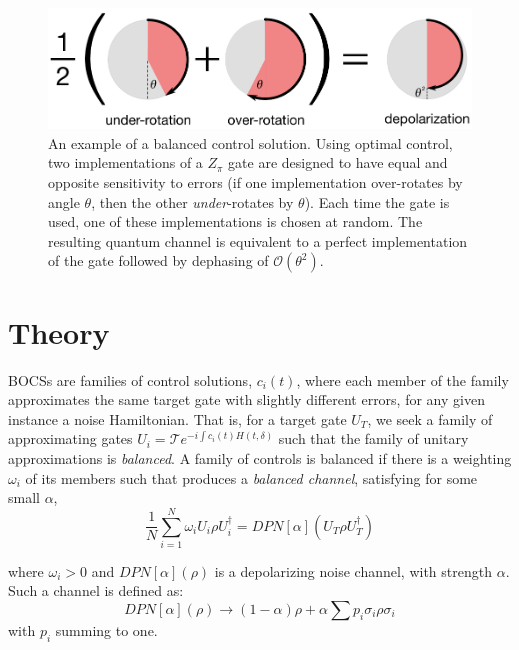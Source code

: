 \documentclass[aps,nofootinbib,pra,notitlepage,twocolumn]{revtex4-1}
\newcommand{\order}[1]{\mathcal{O}\left( #1 \right)}
\begin{document}
\begin{figure}
  \centering
  \includegraphics[width=\columnwidth]{simple_example.pdf}
  \caption{An example of a balanced control solution. Using optimal control, two implementations of a $Z_\pi$ gate are designed to have equal and opposite sensitivity to errors (if one implementation over-rotates by angle $\theta$, then the other \emph{under}-rotates by $\theta$). Each time the gate is used, one of these implementations is chosen at random. The resulting quantum channel is equivalent to a perfect implementation of the gate followed by dephasing of $\order{\theta^2}$.}
  \label{fig:simple_example}
\end{figure}

\section{Theory}
 BOCSs are families of control solutions, $c_i(t)$, where each member of the family approximates the same target gate with slightly different errors, for any given instance a noise Hamiltonian. That is, for a target gate $U_T$, we seek a family of approximating gates $U_i = \mathcal{T}e^{-i\int c_i(t)H(t, \delta)}$ such that the family of unitary approximations is \emph{balanced}. A family of controls is balanced if there is a weighting $\omega_i$ of its members such that produces a \textit{balanced channel}, satisfying for some small $\alpha$,
\begin{equation}\label{eq:1}
  \frac{1}{N}\sum_{i=1}^N \omega_i U_i \rho U_i^\dagger = DPN[\alpha]\left(U_T \rho U_T^\dagger \right)
\end{equation}

where $\omega_i > 0$ and $DPN[\alpha](\rho)$ is a depolarizing noise channel, with strength $\alpha$. Such a channel is defined as:
\begin{equation}\label{eq:2}
  DPN[\alpha](\rho) \rightarrow (1-\alpha)\rho + \alpha\sum p_i \sigma_i\rho\sigma_i
\end{equation}
with $p_i$ summing to one. 
\end{document}
